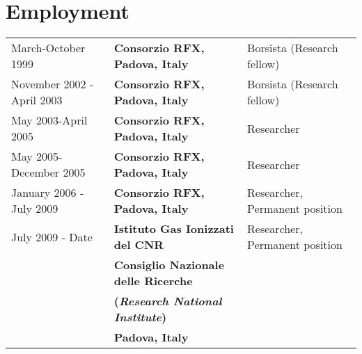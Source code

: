 
\section{Employment}
\begin{tabular}{lll}
March-October 1999 & \textbf{Consorzio RFX, Padova, Italy} & Borsista
(Research fellow) \\
November 2002 - April 2003 & \textbf{Consorzio RFX, Padova, Italy} &
Borsista (Research fellow) \\
May 2003-April 2005 & \textbf{Consorzio RFX, Padova, Italy} &
Researcher \\ 
May 2005-December 2005 & \textbf{Consorzio RFX, Padova, Italy} &
Researcher \\
January 2006 - July 2009 & \textbf{Consorzio RFX, Padova, Italy} &
Researcher, Permanent position \\
July 2009 - Date & \textbf{Istituto Gas Ionizzati del CNR} &
Researcher, Permanent position \\
& \textbf{Consiglio Nazionale delle Ricerche } & \\
& \textbf{(\emph{Research National Institute})}& \\
& \textbf{Padova, Italy} & 
\end{tabular}
